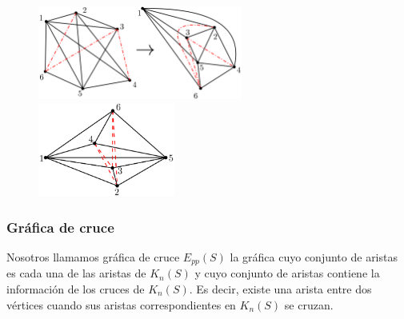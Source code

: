 \begin{frame}
	\begin{figure}
		\centering
		\includegraphics[width=0.6\textwidth]{images/K6_thicknes2}%
		~\vrule
		\includegraphics[width=0.4\textwidth]{images/K6_gthicknes2}
	\end{figure}
\end{frame}

\begin{frame}\frametitle{Gráfica de cruce}
Nosotros llamamos gráfica de cruce $E_{pp}(S)$ la gráfica cuyo conjunto de aristas es cada una de las aristas de $K_n(S)$ y cuyo conjunto de aristas contiene la información de los cruces de $K_n(S)$. Es decir, existe una arista entre dos vértices cuando sus aristas correspondientes en $K_n(S)$ se cruzan.
\end{frame}

